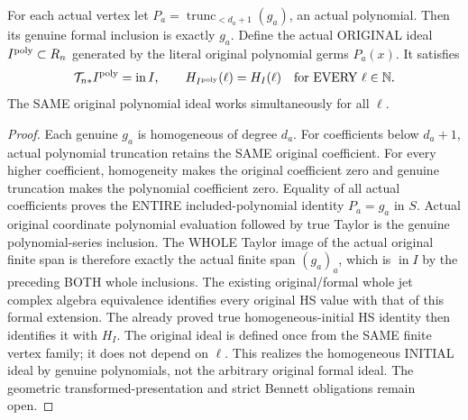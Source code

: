 \begin{theorem}
\label{hir:actual-original-polynomial-initial-ideal-realization}
For each actual vertex let $P_a=\operatorname{trunc}_{<d_a+1}(g_a)$,
an actual polynomial. Then its genuine formal inclusion is exactly $g_a$.
Define the actual ORIGINAL ideal $I^{\rm poly}\subset R_n$ generated
by the literal original polynomial germs $P_a(x)$. It satisfies
\[
 \mathcal T_{n*}I^{\rm poly}=\operatorname{in}I,\qquad
 H_{I^{\rm poly}}(\ell)=H_I(\ell)\quad\text{for EVERY }\ell\in\mathbb N.
\]
The SAME original polynomial ideal works simultaneously for all $\ell$.
\leanok
\end{theorem}
\begin{proof}
Each genuine $g_a$ is homogeneous of degree $d_a$. For coefficients
below $d_a+1$, actual polynomial truncation retains the SAME original
coefficient. For every higher coefficient, homogeneity makes the
original coefficient zero and genuine truncation makes the polynomial
coefficient zero. Equality of all actual coefficients proves the
ENTIRE included-polynomial identity $P_a=g_a$ in $S$.
Actual original coordinate polynomial evaluation followed by true
Taylor is the genuine polynomial-series inclusion. The WHOLE Taylor
image of the actual original finite span is therefore exactly the
actual finite span $(g_a)_a$, which is $\operatorname{in}I$ by the
preceding BOTH whole inclusions. The existing original/formal whole
jet complex algebra equivalence identifies every original HS value
with that of this formal extension. The already proved true
homogeneous-initial HS identity then identifies it with $H_I$.
The original ideal is defined once from the SAME finite vertex family;
it does not depend on $\ell$. This realizes the homogeneous INITIAL
ideal by genuine polynomials, not the arbitrary original formal ideal.
The geometric transformed-presentation and strict Bennett obligations
remain open.
\end{proof}
